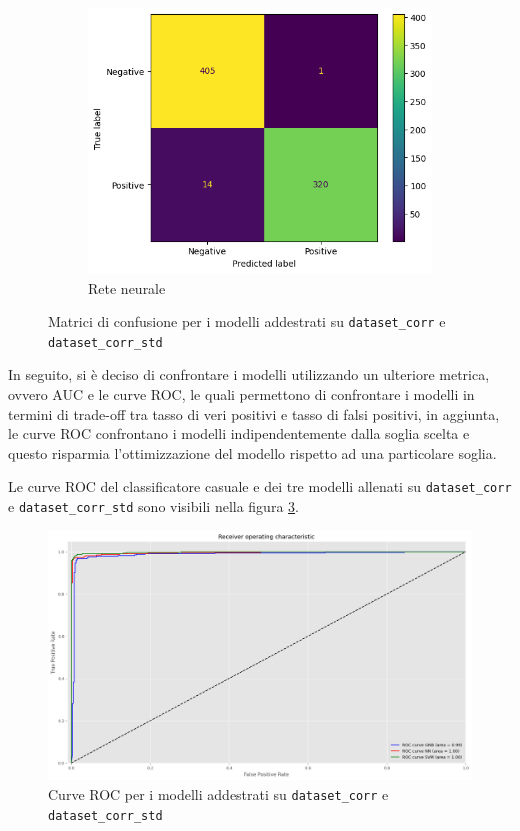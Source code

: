 \begin{figure}[!ht]
\begin{subfigure}{.45\textwidth}
    \end{subfigure}
    \hfill
    \begin{subfigure}{.45\textwidth}
        \centering
        \includegraphics[width=\textwidth]{img/rete/matrice_confusione.png}
        \caption{Rete neurale}
        \label{fig:matrice_di_confusione_per_NN_corr}
    \end{subfigure}
    \caption{Matrici di confusione per i modelli addestrati su \texttt{dataset\_corr} e \texttt{dataset\_corr\_std}}
    \label{fig:matrice_di_confusione_per_corr}
\end{figure}

In seguito, si è deciso di confrontare i modelli utilizzando un ulteriore metrica,
ovvero AUC e le curve ROC, le quali permettono di confrontare i modelli in termini
di trade-off tra tasso di veri positivi e tasso di falsi positivi, in aggiunta,
le curve ROC confrontano i modelli indipendentemente dalla soglia scelta e questo
risparmia l'ottimizzazione del modello rispetto ad una particolare soglia.

Le curve ROC del classificatore casuale e dei tre modelli allenati su 
\texttt{dataset\_corr} e \texttt{dataset\_corr\_std} sono visibili nella figura 
\ref{fig:roc_curve_corr}.
\begin{figure}[!ht]
    \centering
    \includegraphics[width=\textwidth]{img/ris/roc_curve_corr.png}
    \caption{Curve ROC per i modelli addestrati su \texttt{dataset\_corr} e \texttt{dataset\_corr\_std}}
    \label{fig:roc_curve_corr}
\end{figure}

